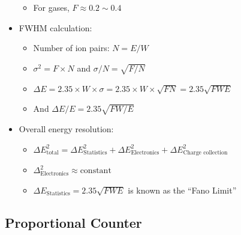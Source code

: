 \begin{itemize}
\begin{itemize}
        \item For gases, $F\approx0.2\sim0.4$
    \end{itemize}
    \item FWHM calculation:
    \begin{itemize}
        \item[] Number of ion pairs: $N=E/W$
        \item[] $\sigma^2=F\times N$ and $\sigma/N=\sqrt{F/N}$
        \item[] $\Delta E=2.35\times W\times \sigma=2.35\times W\times\sqrt{FN}=2.35\sqrt{FWE}$
        \item[] And $\Delta E/E=2.35\sqrt{FW/E}$
    \end{itemize}
    \item Overall energy resolution:
    \begin{itemize}
        \item[] $\Delta E^2_\text{total}=\Delta E^2_\text{Statistics}+\Delta E^2_\text{Electronics}+\Delta E^2_\text{Charge collection}$
        \item[] $\Delta^2_\text{Electronics}\approx\text{constant}$
        \item[] $\Delta E_\text{Statistics}=2.35\sqrt{FWE}$ is known as the ``Fano Limit''
    \end{itemize}
\end{itemize}
\subsection{Proportional Counter}
